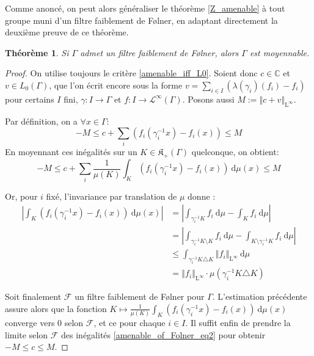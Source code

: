 \documentclass[a4paper,12pt]{article}
\newtheorem{theorem}{Théorème}[section]
\newcommand{\C}{\mathbb{C}}
\newcommand{\norm}[1]{\left\Vert #1\right\Vert}
\newcommand{\abs}[1]{\left\vert#1\right\vert}
\newcommand{\integral}[4]{\int_{#1}^{#2} #3~\mathrm{d}#4}
\newcommand{\inv}{^{-1}}
\begin{document}
Comme anoncé, on peut alors généraliser le théorème \ref{Z_amenable} à tout groupe muni d'un filtre faiblement de F\o{}lner,
en adaptant directement la deuxième preuve de ce théorème.

\begin{theorem}\label{amenable_of_Folner}
    Si $\Gamma$ admet un filtre faiblement de F\o{}lner, alors $\Gamma$ est moyennable.
\end{theorem}

\begin{proof}
    On utilise toujours le critère \ref{amenable_iff_L0}. Soient donc $c\in\C$ et $v\in L_0(\Gamma)$, 
    que l'on écrit encore sous la forme $v = \sum_{i\in I} (\lambda(\gamma_i)(f_i) - f_i)$ pour certains $I$ fini, $\gamma : I \to\Gamma$ et
    $f : I\to \mathscr{L}^\infty(\Gamma)$. Posons aussi $M := \norm{c + v}_{\mathrm{L}^\infty}$.

    Par définition, on a $\forall x\in\Gamma$:
    \begin{equation}\label{amenable_of_Folner_eq1}
        -M \le c + \sum_i (f_i(\gamma_i\inv x) - f_i(x)) \le M
    \end{equation}
    En moyennant ces inégalités sur un $K\in\mathfrak{K}_+(\Gamma)$ quelconque, on obtient:
    \begin{equation}\label{amenable_of_Folner_eq2}
        -M \le c + \sum_i \frac1{\mu(K)} \integral{K}{}{\left(f_i(\gamma_i\inv x) - f_i(x)\right)}{\mu(x)} \le M
    \end{equation}

    Or, pour $i$ fixé, l'invariance par translation de $\mu$ donne :
    \begin{align*}
        \abs{\integral{K}{}{(f_i(\gamma_i\inv x) - f_i(x))}{\mu(x)}} 
            &= \abs{\integral{\gamma_i\inv K}{}{f_i}{\mu} - \integral{K}{}{f_i}{\mu}} \\
            &= \abs{\integral{\gamma_i\inv K\setminus K}{}{f_i}{\mu} - \integral{K\setminus\gamma_i\inv K}{}{f_i}{\mu}} \\
            &\le \integral{\gamma_i\inv K\triangle K}{}{\norm{f_i}_{\mathrm{L}^\infty}}{\mu} \\
            &= \norm{f_i}_{\mathrm{L}^\infty} \cdot \mu(\gamma_i\inv K\triangle K)
    \end{align*}
    
    Soit finalement $\mathscr{F}$ un filtre faiblement de F\o{}lner pour $\Gamma$. L'estimation précédente assure alors que
    la fonction $K\mapsto\frac1{\mu(K)} \integral{K}{}{(f_i(\gamma_i\inv x) - f_i(x))}{\mu(x)}$ converge vers $0$
    selon $\mathscr{F}$, et ce pour chaque $i\in I$. Il suffit enfin de prendre la limite selon $\mathscr{F}$ des inégalités \ref{amenable_of_Folner_eq2}
    pour obtenir $-M\le c\le M$. 
\end{proof}
\end{document}
